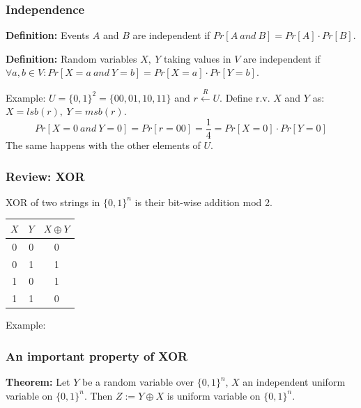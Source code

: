 \documentclass[12pt]{book}
\newcommand{\Thm}{\textbf{Theorem:} }
\newcommand{\Def}{\textcolor{dkgreen}{\textbf{Definition:}} }
\begin{document}
\subsubsection{Independence}
\Def Events $A$ and $B$ are independent if $Pr[A\ and\ B]=Pr[A]\cdot Pr[B]$.

\Def Random variables $X,\ Y$ taking values in $V$ are independent if $\forall a,b\in V:Pr[X=a\ and\ Y=b] = Pr[X=a]\cdot Pr[Y=b]$.

Example: $U=\{0,1\}^{2}=\{00,01,10,11\}$ and $r\xleftarrow{R}U$. Define r.v. $X$ and $Y$ as: $X=lsb(r),\ Y=msb(r)$. $$Pr[X=0\ and\ Y=0]=Pr[r=00]=\frac{1}{4}=Pr[X=0]\cdot Pr[Y=0]$$The same happens with the other elements of $U$.

\subsubsection{Review: XOR}
XOR of two strings in $\{0,1\}^{n}$ is their bit-wise addition mod 2.
\begin{table}[!h]
	\centering
	\begin{tabular}{cc|c}
		$X$&$Y$&$X\oplus Y$\\\hline
		0&0&0\\
		0&1&1\\
		1&0&1\\
		1&1&0
	\end{tabular}
\end{table}

Example:
\begin{center}
\end{center}

\subsubsection{An important property of XOR}
\Thm Let $Y$ be a random variable over $\{0,1\}^{n}$, $X$ an independent uniform variable on $\{0,1\}^{n}$. Then $Z:=Y\oplus X$ is uniform variable on $\{0,1\}^{n}$.
\end{document}
